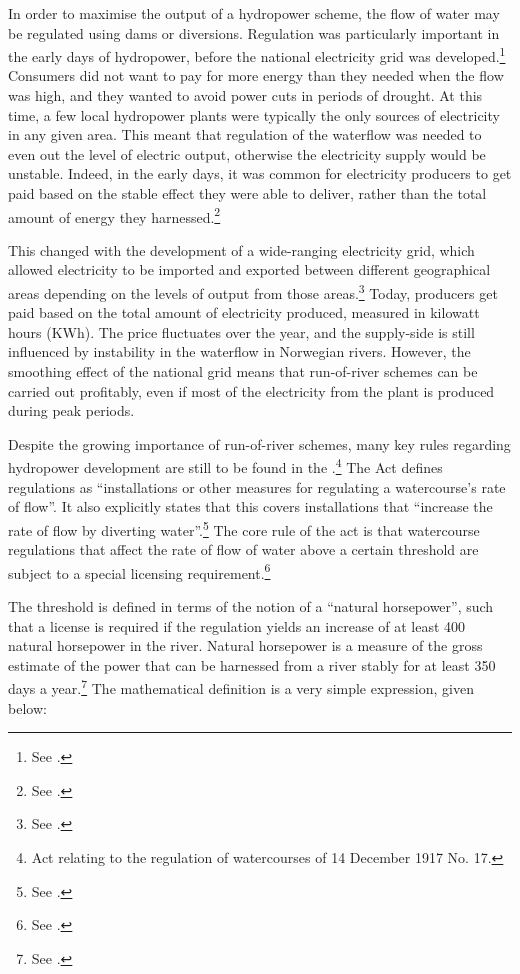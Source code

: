 In order to maximise the output of a hydropower scheme, the flow of water may be regulated using dams or diversions. Regulation was particularly important in the early days of hydropower, before the national electricity grid was developed.\footnote{See \cite[83]{uleberg08}.} Consumers did not want to pay for more energy than they needed when the flow was high, and they wanted to avoid power cuts in periods of drought. At this time, a few local hydropower plants were typically the only sources of electricity in any given area. This meant that regulation of the waterflow was needed to even out the level of electric output, otherwise the electricity supply would be unstable. Indeed, in the early days, it was common for electricity producers to get paid based on the stable effect they were able to deliver, rather than the total amount of energy they harnessed.\footnote{See \cite{sofienlund07}.}

This changed with the development of a wide-ranging electricity grid, which allowed electricity to be imported and exported between different geographical areas depending on the levels of output from those areas.\footnote{See \cite[83-84]{uleberg08}.} Today, producers get paid based on the total amount of electricity produced, measured in kilowatt hours (KWh). The price fluctuates over the year, and the supply-side is still influenced by instability in the waterflow in Norwegian rivers. However, the smoothing effect of the national grid means that run-of-river schemes can be carried out profitably, even if most of the electricity from the plant is produced during peak periods. %

Despite the growing importance of run-of-river schemes, many key rules regarding hydropower development are still to be found in the \cite{wra17}.\footnote{Act relating to the regulation of watercourses of 14 December 1917 No. 17.} The Act defines regulations as ``installations or other measures for regulating a watercourse's rate of flow''. It also explicitly states that this covers installations that ``increase the rate of flow by diverting water''.\footnote{See \cite[1]{wra17}.} The core rule of the act is that watercourse regulations that affect the rate of flow of water above a certain threshold are subject to a special licensing requirement.\footnote{See \cite[2]{wra17}.}

The threshold is defined in terms of the notion of a ``natural horsepower'', such that a license is required if the regulation yields an increase of at least 400 natural horsepower in the river. Natural horsepower is a measure of the gross estimate of the power that can be harnessed from a river stably for at least 350 days a year.\footnote{See \cite[2]{wra17}.} The mathematical definition is a very simple expression, given below:

